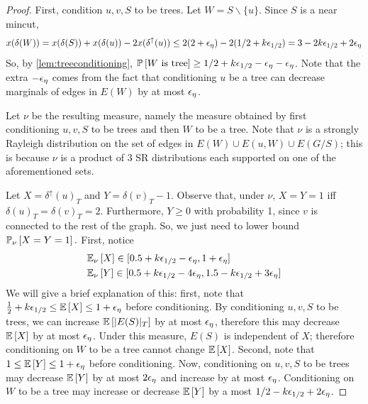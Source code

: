 \begin{proof}
First, condition $u,v,S$  to be trees.
Let $W=S\smallsetminus \{u\}$. 
Since $S$ is a near mincut,
\begin{eqnarray*}
x(\delta(W))=x(\delta(S))+x(\delta(u))-2x(\delta^\uparrow(u))\leq 2(2+{\epsilon}_\eta) - 2(1/2+k{\epsilon}_{1/2})=3-2k{\epsilon}_{1/2}+2{\epsilon}_{\eta}
\end{eqnarray*}
 So, by \cref{lem:treeconditioning}, 
${\mathbb{P}}\left[W\text{ is tree}\right] \geq 1/2+k{\epsilon}_{1/2}-{\epsilon}_\eta-{\epsilon}_\eta$. Note that the extra $-{\epsilon}_{\eta}$ comes from the fact that conditioning $u$ be a tree can decrease marginals of edges in $E(W)$ by at most ${\epsilon}_\eta$.

Let $\nu$ be the resulting measure, namely the measure obtained by first conditioning $u,v,S$ to be trees and then $W$ to be a tree. Note that $\nu$ is a strongly Rayleigh distribution on the set of edges in $E(W) \cup E(u,W)\cup E(G/S)$; this is because $\nu$ is a product of 3 SR distributions each supported on one of the aforementioned sets. 

Let $X=\delta^\uparrow(u)_T$ and $Y=\delta(v)_T-1$. Observe that, under $\nu$, $X=Y=1$ iff $\delta(u)_T=\delta(v)_T=2$. Furthermore, $Y\geq 0$ with probability 1, since $v$ is connected to the rest of the graph. So, we just need to lower bound ${\mathbb{P}}_{\nu}\left[X=Y=1\right].$ First, notice
\begin{equation}\begin{aligned}
 &\EE{\nu}{X}\in [0.5+k\eps_{1/2}-\eps_\eta,1+\eps_\eta]
 \\
 &\EE{\nu}{Y} \in  [0.5+k\eps_{1/2}-4\eps_\eta,1.5-k\eps_{1/2}+3\eps_\eta]%
\label{eq:EnuXYeps1/2up}
\end{aligned}\end{equation}
We will give a brief explanation of this: first, note that $\frac{1}{2}+k{\epsilon}_{1/2} \le {\mathbb{E}}\left[X\right] \le 1+{\epsilon}_\eta$ before conditioning. By conditioning $u,v,S$ to be trees, we can increase ${\mathbb{E}}\left[|E(S)|_T\right]$ by at most ${\epsilon}_\eta$, therefore this may decrease ${\mathbb{E}}\left[X\right]$ by at most ${\epsilon}_\eta$. Under this measure, $E(S)$ is independent of $X$; therefore conditioning on $W$ to be a tree cannot change ${\mathbb{E}}\left[X\right]$. Second, note that $1 \le {\mathbb{E}}\left[Y\right] \le 1+{\epsilon}_\eta$ before conditioning. Now, conditioning on $u,v,S$ to be trees may decrease ${\mathbb{E}}\left[Y\right]$ by at most $2{\epsilon}_\eta$ and increase by at most ${\epsilon}_\eta$. Conditioning on $W$ to be a tree may increase or decrease ${\mathbb{E}}\left[Y\right]$ by a most $1/2-k{\epsilon}_{1/2}+2{\epsilon}_\eta$.


\end{proof}
